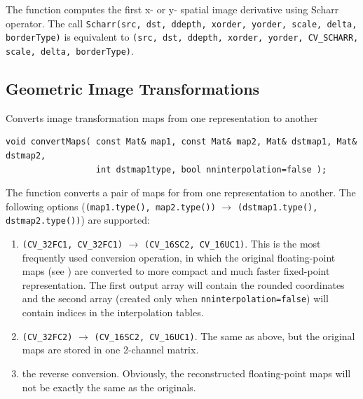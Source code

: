 The function computes the first x- or y- spatial image derivative using Scharr operator. The call \texttt{Scharr(src, dst, ddepth, xorder, yorder, scale, delta, borderType)} is equivalent to \texttt{(src, dst, ddepth, xorder, yorder, CV\_SCHARR, scale, delta, borderType)}. 

\subsection{Geometric Image Transformations}

\label{convertMaps}
Converts image transformation maps from one representation to another

\begin{lstlisting}
void convertMaps( const Mat& map1, const Mat& map2, Mat& dstmap1, Mat& dstmap2,
                  int dstmap1type, bool nninterpolation=false );
\end{lstlisting}
\begin{description}
\end{description}

The function converts a pair of maps for  from one representation to another. The following options (\texttt{(map1.type(), map2.type())} $\rightarrow$ \texttt{(dstmap1.type(), dstmap2.type())}) are supported:
\begin{enumerate}
    \item \texttt{(CV\_32FC1, CV\_32FC1)} $\rightarrow$ \texttt{(CV\_16SC2, CV\_16UC1)}. This is the most frequently used conversion operation, in which the original floating-point maps (see ) are converted to more compact and much faster fixed-point representation. The first output array will contain the rounded coordinates and the second array (created only when \texttt{nninterpolation=false}) will contain indices in the interpolation tables.   
    \item \texttt{(CV\_32FC2)} $\rightarrow$ \texttt{(CV\_16SC2, CV\_16UC1)}. The same as above, but the original maps are stored in one 2-channel matrix.
    \item the reverse conversion. Obviously, the reconstructed floating-point maps will not be exactly the same as the originals.
\end{enumerate} 

